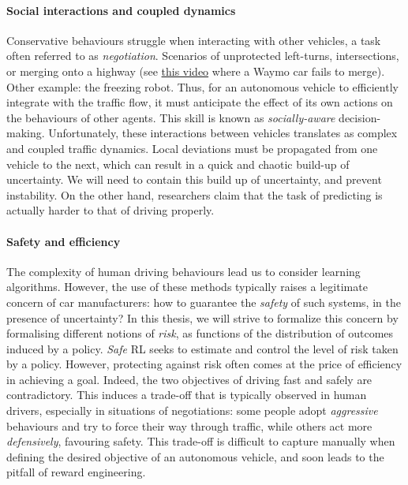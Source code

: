 \paragraph{Social interactions and coupled dynamics}

Conservative behaviours struggle when interacting with other vehicles, a task often referred to as \emph{negotiation}. Scenarios of unprotected left-turns, intersections, or merging onto a highway (see \eg \href{%
	https://www.youtube.com/watch?v=HjtiiGCe1pE}{this video} where a Waymo car fails to merge). Other example: the freezing robot.
Thus, for an autonomous vehicle to efficiently integrate with the traffic flow, it must anticipate the effect of its own actions on the behaviours of other agents. This skill is known as \emph{socially-aware} decision-making. Unfortunately, these interactions between vehicles translates as complex and coupled traffic dynamics. Local deviations must be propagated from one vehicle to the next, which can result in a quick and chaotic build-up of uncertainty. We will need to contain this build up of uncertainty, and prevent instability. On the other hand, researchers claim that the task of predicting is actually harder to that of driving properly.

\paragraph{Safety and efficiency}

The complexity of human driving behaviours lead us to consider learning algorithms. However, the use of these methods typically raises a legitimate concern of car manufacturers: how to guarantee the \emph{safety} of such systems, in the presence of uncertainty? In this thesis, we will strive to formalize this concern by formalising different notions of \emph{risk}, as functions of the distribution of outcomes induced by a policy. \emph{Safe} \acl*{RL} seeks to estimate and control the level of risk taken by a policy.
However, protecting against risk often comes at the price of efficiency in achieving a goal. Indeed, the two objectives of driving fast and safely are contradictory. This induces a trade-off that is typically observed in human drivers, especially in situations of negotiations: some people adopt \emph{aggressive} behaviours and try to force their way through traffic, while others act more \emph{defensively}, favouring safety. This trade-off is difficult to capture manually when defining the desired objective of an autonomous vehicle, and soon leads to the pitfall of reward engineering.

